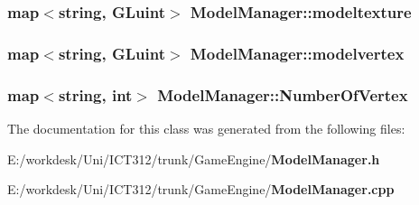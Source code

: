 \subsubsection[{modeltexture}]{\setlength{\rightskip}{0pt plus 5cm}map$<${\bf string}, {\bf G\+Luint}$>$ Model\+Manager\+::modeltexture\hspace{0.3cm}{\ttfamily [private]}}\label{class_model_manager_af2b2f0c3995a0ea7c4cdf296e6091a67}
\subsubsection[{modelvertex}]{\setlength{\rightskip}{0pt plus 5cm}map$<${\bf string}, {\bf G\+Luint}$>$ Model\+Manager\+::modelvertex\hspace{0.3cm}{\ttfamily [private]}}\label{class_model_manager_a7663a14aa0ab83bc0609f7be359f80fb}
\subsubsection[{Number\+Of\+Vertex}]{\setlength{\rightskip}{0pt plus 5cm}map$<${\bf string}, int$>$ Model\+Manager\+::\+Number\+Of\+Vertex\hspace{0.3cm}{\ttfamily [private]}}\label{class_model_manager_a127ce4c29287a9d29b60b4278158d6ff}


The documentation for this class was generated from the following files\+:\begin{DoxyCompactItemize}
\item 
E\+:/workdesk/\+Uni/\+I\+C\+T312/trunk/\+Game\+Engine/{\bf Model\+Manager.\+h}\item 
E\+:/workdesk/\+Uni/\+I\+C\+T312/trunk/\+Game\+Engine/{\bf Model\+Manager.\+cpp}\end{DoxyCompactItemize}
